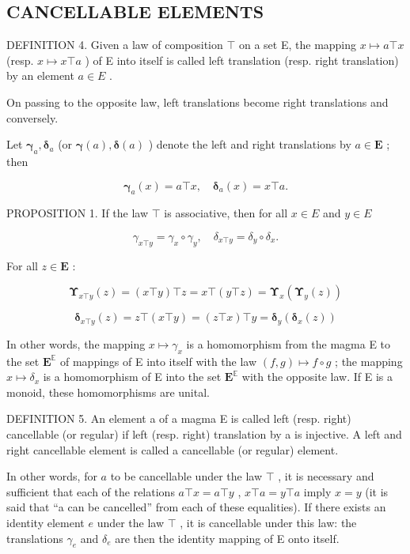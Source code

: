 \subsection{CANCELLABLE ELEMENTS}

DEFINITION 4. Given a law of composition \(\top\) on a set E, the mapping \(x \mapsto a \top x\) (resp. \(x \mapsto x \top a\) ) of E into itself is called left translation (resp. right translation) by an element \(a \in E\) .

On passing to the opposite law, left translations become right translations and conversely.

Let \(\pmb{\gamma}_{a},\pmb{\delta}_{a}\) (or \(\pmb {\gamma}(a),\pmb {\delta}(a)\) ) denote the left and right translations by \(a\in \mathbf{E}\) ; then

\[
\boldsymbol {\gamma} _ {a} (x) = a \top x, \quad \boldsymbol {\delta} _ {a} (x) = x \top a.
\]

PROPOSITION 1. If the law \(\top\) is associative, then for all \(x \in E\) and \(y \in E\)

\[
\gamma_ {x \top y} = \gamma_ {x} \circ \gamma_ {y}, \quad \delta_ {x \top y} = \delta_ {y} \circ \delta_ {x}.
\]

For all \(z \in \mathbf{E}\) :

\[
\boldsymbol {\Upsilon} _ {x \top y} (z) = (x \top y) \top z = x \top (y \top z) = \boldsymbol {\Upsilon} _ {x} (\boldsymbol {\Upsilon} _ {y} (z))
\]

\[
\boldsymbol {\delta} _ {x \top y} (z) = z \top (x \top y) = (z \top x) \top y = \boldsymbol {\delta} _ {y} (\boldsymbol {\delta} _ {x} (z))
\]

In other words, the mapping \(x \mapsto \gamma_x\) is a homomorphism from the magma E to the set \(\mathbf{E}^{\mathbb{E}}\) of mappings of E into itself with the law \((f, g) \mapsto f \circ g\) ; the mapping \(x \mapsto \delta_x\) is a homomorphism of E into the set \(\mathbf{E}^{\mathbb{E}}\) with the opposite law. If E is a monoid, these homomorphisms are unital.

DEFINITION 5. An element a of a magma E is called left (resp. right) cancellable (or regular) if left (resp. right) translation by a is injective. A left and right cancellable element is called a cancellable (or regular) element.

In other words, for \(a\) to be cancellable under the law \(\top\) , it is necessary and sufficient that each of the relations \(a \top x = a \top y\) , \(x \top a = y \top a\) imply \(x = y\) (it is said that ``a can be cancelled'' from each of these equalities). If there exists an identity element \(e\) under the law \(\top\) , it is cancellable under this law: the translations \(\gamma_e\) and \(\delta_e\) are then the identity mapping of E onto itself.

